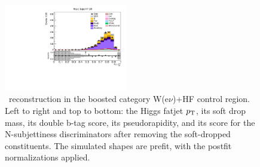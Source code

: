 \begin{figure}[tbp]
\begin{center}
    \includegraphics[width=0.48\textwidth]{figures/wlnhbb2016/boosted/WenWHHeavyFlavorFJCR_fj1Tau32SD.pdf}
    \caption{\HBB\ reconstruction in the boosted category W(e$\nu$)+HF control region.
    Left to right and top to bottom: the Higgs fatjet $p_{\mathrm{T}}$, its soft drop mass, its
    double b-tag score, its pseudorapidity, and its score for the N-subjettiness discriminators
    after removing the soft-dropped constituents.
    The simulated shapes are prefit, with the postfit normalizations applied.}
    \label{fig:boost_WenHF_Hbb}
  \end{center}
\end{figure}
\clearpage


